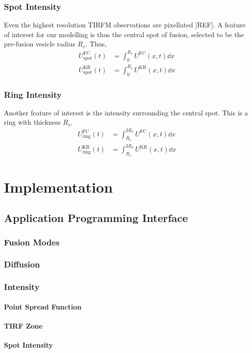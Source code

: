 \documentclass{report}
\newcommand\FC{{ \text{FC} }}
\newcommand\KR{{ \text{KR} }}
\newcommand\spot{{ \text{spot} }}
\newcommand\ring{{ \text{ring}  }}
\begin{document}
\section{Spot Intensity}
Even the highest resolution TIRFM observations are pixellated [REF]. A feature of interest for our modelling is thus the central spot of fusion, selected to be the pre-fusion vesicle radius $R_v$. Thus,
\begin{align*}
	U^\FC_\spot(t) &= \int_0^{R_v} U^\FC(x, t) \dd{x} \\
	U^\KR_\spot(t) &= \int_0^{R_v} U^\KR(x, t) \dd{x}
\end{align*}

\section{Ring Intensity}
Another feature of interest is the intensity surrounding the central spot. This is a ring with thickness $R_v$.
\begin{align*}
	U^\FC_\ring(t) &= \int_{R_v}^{2R_v} U^\FC(x, t) \dd{x} \\
	U^\KR_\ring(t) &= \int_{R_v}^{2R_v} U^\KR(x, t) \dd{x}
\end{align*}

\part{Implementation}
\chapter{Application Programming Interface}
\section{Fusion Modes}
\section{Diffusion}
\section{Intensity}
\subsection{Point Spread Function}
\subsection{TIRF Zone}
\subsection{Spot Intensity}
\end{document}
